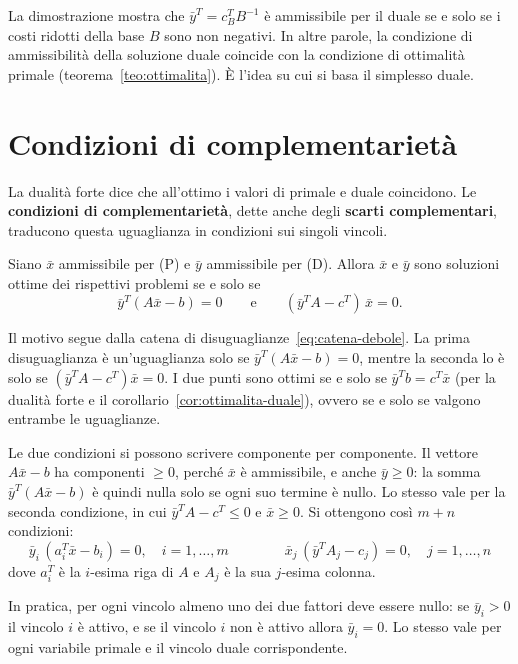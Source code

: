 \begin{osservazione}
La dimostrazione mostra che $\bar{y}^T = c_B^T B^{-1}$ è ammissibile per il duale se e solo se i costi ridotti della base $B$ sono non negativi. In altre parole, la condizione di ammissibilità della soluzione duale coincide con la condizione di ottimalità primale (teorema~\ref{teo:ottimalita}). È l'idea su cui si basa il simplesso duale.
\end{osservazione}

\section{Condizioni di complementarietà}\label{sec:complementarieta}
La dualità forte dice che all'ottimo i valori di primale e duale coincidono. Le \textbf{condizioni di complementarietà}, dette anche degli \textbf{scarti complementari}, traducono questa uguaglianza in condizioni sui singoli vincoli.

\begin{teorema}\label{teo:complementarieta}
Siano $\bar{x}$ ammissibile per (P) e $\bar{y}$ ammissibile per (D). Allora $\bar{x}$ e $\bar{y}$ sono soluzioni ottime dei rispettivi problemi se e solo se
\[
\bar{y}^T (A\bar{x} - b) = 0 \qquad \text{e} \qquad (\bar{y}^T A - c^T)\, \bar{x} = 0.
\]
\end{teorema}

Il motivo segue dalla catena di disuguaglianze~\eqref{eq:catena-debole}. La prima disuguaglianza è un'uguaglianza solo se $\bar{y}^T(A\bar{x} - b) = 0$, mentre la seconda lo è solo se $(\bar{y}^T A - c^T)\bar{x} = 0$. I due punti sono ottimi se e solo se $\bar{y}^T b = c^T \bar{x}$ (per la dualità forte e il corollario~\ref{cor:ottimalita-duale}), ovvero se e solo se valgono entrambe le uguaglianze.

Le due condizioni si possono scrivere componente per componente. Il vettore $A\bar{x} - b$ ha componenti $\ge 0$, perché $\bar{x}$ è ammissibile, e anche $\bar{y} \ge 0$: la somma $\bar{y}^T(A\bar{x} - b)$ è quindi nulla solo se ogni suo termine è nullo. Lo stesso vale per la seconda condizione, in cui $\bar{y}^T A - c^T \le 0$ e $\bar{x} \ge 0$. Si ottengono così $m + n$ condizioni:
\[
\bar{y}_i \,(a_i^T \bar{x} - b_i) = 0, \quad i = 1, \dots, m \qquad\qquad \bar{x}_j \,(\bar{y}^T A_j - c_j) = 0, \quad j = 1, \dots, n
\]
dove $a_i^T$ è la $i$-esima riga di $A$ e $A_j$ è la sua $j$-esima colonna.

In pratica, per ogni vincolo almeno uno dei due fattori deve essere nullo: se $\bar{y}_i > 0$ il vincolo $i$ è attivo, e se il vincolo $i$ non è attivo allora $\bar{y}_i = 0$. Lo stesso vale per ogni variabile primale e il vincolo duale corrispondente.

